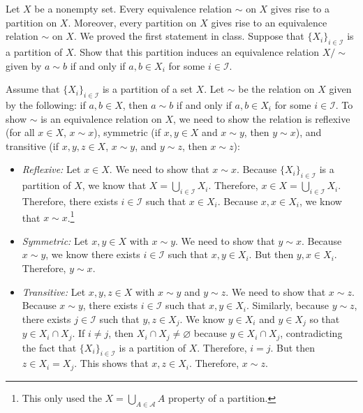 \documentclass[11pt,letterpaper]{article}
\begin{document}
 Let $X$ be a nonempty set. Every equivalence relation $\sim$ on $X$ gives rise to a partition on $X$. Moreover, every partition on $X$ gives rise to an equivalence relation $\sim$ on $X$. We proved the first statement in class. Suppose that $\{ X_i \}_{i \in \mathcal{I}}$ is a partition of $X$. Show that this partition induces an equivalence relation $X/\sim$ given by $a \sim b$ if and only if $a, b \in X_i$ for some $i \in \mathcal{I}$. \pspace

\sol Assume that $\{ X_i \}_{i \in \mathcal{I}}$ is a partition of a set $X$. Let $\sim$ be the relation on $X$ given by the following: if $a, b \in X$, then $a \sim b$ if and only if $a, b \in X_i$ for some $i \in \mathcal{I}$. To show $\sim$ is an equivalence relation on $X$, we need to show the relation is reflexive (for all $x \in X$, $x \sim x$), symmetric (if $x, y \in X$ and $x \sim y$, then $y \sim x$), and transitive (if $x, y, z \in X$, $x \sim y$, and $y \sim z$, then $x \sim z$):
	\begin{itemize}
	\item \textit{Reflexive:} Let $x \in X$. We need to show that $x \sim x$. Because $\{ X_i \}_{i \in \mathcal{I}}$ is a partition of $X$, we know that $X= \bigcup_{i \in \mathcal{I}} X_i$. Therefore, $x \in X= \bigcup_{i \in \mathcal{I}} X_i$. Therefore, there exists $i \in \mathcal{I}$ such that $x \in X_i$. Because $x, x \in X_i$, we know that $x \sim x$.\footnote{\label{PartitionFootnote}This only used the $X= \bigcup_{A \in \mathcal{A}} A$ property of a partition.} \par\vspace{0.2cm}
	
	\item \textit{Symmetric:} Let $x, y \in X$ with $x \sim y$. We need to show that $y \sim x$. Because $x \sim y$, we know there exists $i \in \mathcal{I}$ such that $x, y \in X_i$. But then $y, x \in X_i$. Therefore, $y \sim x$. \par\vspace{0.2cm}
	
	\item \textit{Transitive:} Let $x, y, z \in X$ with $x \sim y$ and $y \sim z$. We need to show that $x \sim z$. Because $x \sim y$, there exists $i \in \mathcal{I}$ such that $x, y \in X_i$. Similarly, because $y \sim z$, there exists $j \in \mathcal{I}$ such that $y, z \in X_j$. We know $y \in X_i$ and $y \in X_j$ so that $y \in X_i \cap X_j$. If $i \neq j$, then $X_i \cap X_j \neq \varnothing$ because $y \in X_i \cap X_j$, contradicting the fact that $\{ X_i \}_{i \in \mathcal{I}}$ is a partition of $X$. Therefore, $i= j$. But then $z \in X_i= X_j$. This shows that $x, z \in X_i$. Therefore, $x \sim z$. 	
	\end{itemize} 
\end{document}
